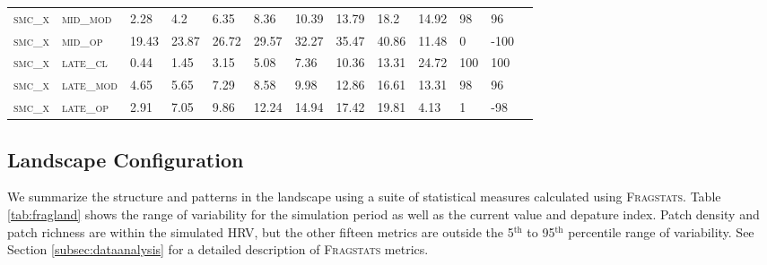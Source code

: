 \begin{landscape}
\begin{table}[!htbp]
\begin{tabular}{@{}lllllllllllll@{}}
\footnotesize \textsc{smc\_x}      & \footnotesize \textsc{mid\_mod  }     & \footnotesize 2.28           & \footnotesize 4.2           & \footnotesize 6.35            & \footnotesize 8.36            & \footnotesize 10.39            & \footnotesize 13.79           & \footnotesize 18.2        & \footnotesize 14.92    & \footnotesize 98    & \footnotesize 96     \\
\footnotesize \textsc{smc\_x}      & \footnotesize \textsc{mid\_op   }     & \footnotesize 19.43           & \footnotesize 23.87           & \footnotesize 26.72            & \footnotesize 29.57            & \footnotesize 32.27            & \footnotesize 35.47           & \footnotesize 40.86        & \footnotesize 11.48    & \footnotesize 0    & \footnotesize -100     \\
\footnotesize \textsc{smc\_x}      & \footnotesize \textsc{late\_cl  }     & \footnotesize 0.44           & \footnotesize 1.45           & \footnotesize 3.15            & \footnotesize 5.08            & \footnotesize 7.36            & \footnotesize 10.36           & \footnotesize 13.31        & \footnotesize 24.72    & \footnotesize 100    & \footnotesize 100     \\
\footnotesize \textsc{smc\_x}      & \footnotesize \textsc{late\_mod }     & \footnotesize 4.65           & \footnotesize 5.65           & \footnotesize 7.29            & \footnotesize 8.58            & \footnotesize 9.98            & \footnotesize 12.86           & \footnotesize 16.61        & \footnotesize 13.31    & \footnotesize 98    & \footnotesize 96     \\
\footnotesize \textsc{smc\_x}      & \footnotesize \textsc{late\_op  }     & \footnotesize 2.91           & \footnotesize 7.05           & \footnotesize 9.86            & \footnotesize 12.24            & \footnotesize 14.94            & \footnotesize 17.42           & \footnotesize 19.81        & \footnotesize 4.13    & \footnotesize 1    & \footnotesize -98     \\ \bottomrule 
\end{tabular}
\end{table}
\end{landscape}



\clearpage
\pagebreak[4]
\subsection{Landscape Configuration}
We summarize the structure and patterns in the landscape using a suite of statistical measures calculated using \textsc{Fragstats}. Table \ref{tab:fragland} shows the range of variability for the simulation period as well as the current value and depature index. Patch density and patch richness are within the simulated HRV, but the other fifteen metrics are outside the 5$^{\text{th}}$ to 95$^{\text{th}}$ percentile range of variability. See Section \ref{subsec:dataanalysis} for a detailed description of \textsc{Fragstats} metrics.

